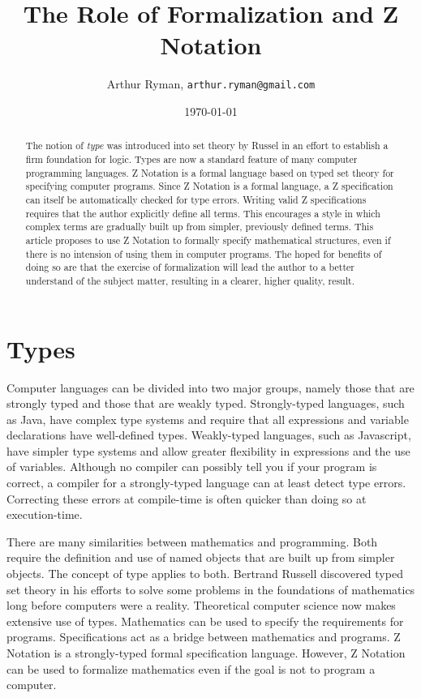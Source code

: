 \documentclass[11pt, oneside]{article}
\title{The Role of Formalization and Z Notation}
\author{Arthur Ryman, {\tt arthur.ryman@gmail.com}}
\date{\today}
\begin{document}
\maketitle

\begin{abstract}
The notion of {\it type} was introduced into set theory by Russel in an effort to establish a firm foundation for logic.
Types are now a standard feature of many computer programming languages.
Z Notation is a formal language based on typed set theory for specifying computer programs.
Since Z Notation is a formal language, a Z specification can itself be automatically checked for type errors.
Writing valid Z specifications requires that the author explicitly define all terms.
This encourages a style in which complex terms are gradually built up from simpler, previously defined terms.
This article proposes to use Z Notation to formally specify mathematical structures, even if there is no intension of using
them in computer programs.
The hoped for benefits of doing so are that the exercise of formalization will lead the author to a better understand of the subject
matter, resulting in a clearer, higher quality, result.
\end{abstract}

\section{Types}

Computer languages can be divided into two major groups, namely those that are strongly typed and those that are weakly typed.
Strongly-typed languages, such as Java, have complex type systems and require that all expressions and variable declarations 
have well-defined types.
Weakly-typed languages, such as Javascript, have simpler type systems and allow greater flexibility in expressions and the use of variables.
Although no compiler can possibly tell you if your program is correct, a compiler for a strongly-typed language can at least detect type errors.
Correcting these errors at compile-time is often quicker than doing so at execution-time.

There are many similarities between mathematics and programming. 
Both require the definition and use of named objects that are built up from simpler objects.
The concept of type applies to both.
Bertrand Russell discovered typed set theory in his efforts to solve some problems in the foundations of mathematics 
long before computers were a reality.
Theoretical computer science now makes extensive use of types.
Mathematics can be used to specify the requirements for programs.
Specifications act as a bridge between mathematics and programs.
Z Notation is a strongly-typed formal specification language.
However, Z Notation can be used to formalize mathematics even if the goal is not to program a computer.
\end{document}
